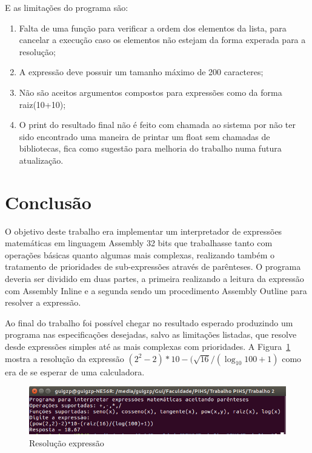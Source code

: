 \documentclass[12pt]{article}
\begin{document}
E as limitações do programa são:

\begin{enumerate}

\item Falta de uma função para verificar a ordem dos elementos da lista, para cancelar a execução caso os elementos não estejam da forma experada para a resolução;

\item A expressão deve possuir um tamanho máximo de 200 caracteres;

\item Não são aceitos argumentos compostos para expressões como da forma raiz(10+10);

\item O print do resultado final não é feito com chamada ao sistema por não ter sido encontrado uma maneira de printar um float sem chamadas de bibliotecas, fica como sugestão para melhoria do trabalho numa futura atualização.

\end{enumerate}

\section*{Conclusão}

O objetivo deste trabalho era implementar um interpretador de expressões matemáticas em linguagem Assembly 32 bits que trabalhasse tanto com  operações básicas quanto algumas mais complexas, realizando também o tratamento de prioridades de sub-expressões através de parênteses. O programa deveria ser dividido em duas partes, a primeira realizando a leitura da expressão com Assembly Inline e a segunda sendo um procedimento Assembly Outline para resolver a expressão.

Ao final do trabalho foi possível chegar no resultado esperado produzindo um programa nas especificações desejadas, salvo as limitações listadas, que resolve desde expressões simples até as mais complexas com prioridades. A Figura~\ref{resultado} mostra a resolução da expressão ${(2^{2} -2)*10-(\sqrt{16}/({\log_{10} 100}+1) }$ como era de se esperar de uma calculadora.

\begin{figure}[H]
\centering
\includegraphics[width=\textwidth]{Imagens/resolvido.png}
\caption{Resolução expressão}
\label{resultado}
\end{figure}


\nocite{*}



\end{document}
